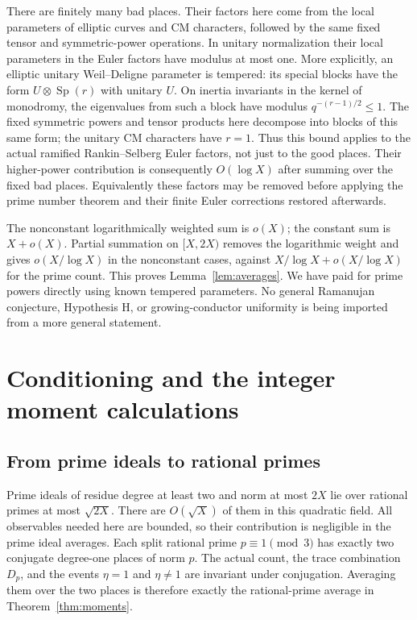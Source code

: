 \documentclass[11pt]{article}
\theoremstyle{definition}\newtheorem{definition}[theorem]{Definition}
\begin{document}
There are finitely many bad places. Their factors here
come from the local parameters of elliptic curves
and CM characters, followed by the same fixed tensor
and symmetric-power operations. In unitary
normalization their local parameters in the Euler
factors have modulus at most one. More explicitly, an elliptic
unitary Weil--Deligne parameter is tempered: its special blocks
have the form $U\otimes\operatorname{Sp}(r)$ with unitary $U$.
On inertia invariants in the kernel of monodromy, the eigenvalues
from such a block have modulus $q^{-(r-1)/2}\le1$.
The fixed symmetric powers and tensor products here decompose into
blocks of this same form; the unitary CM characters have $r=1$.
Thus this bound applies to the actual ramified Rankin--Selberg
Euler factors, not just to the good places.
Their higher-power contribution is consequently
$O(\log X)$ after summing over the fixed bad places.
Equivalently these factors may be removed before
applying the prime number theorem and their finite
Euler corrections restored afterwards.

The nonconstant logarithmically weighted sum is $o(X)$;
the constant sum is $X+o(X)$.
Partial summation on $[X,2X)$ removes the logarithmic
weight and gives $o(X/\log X)$ in the nonconstant cases,
against $X/\log X+o(X/\log X)$ for the prime count.
This proves Lemma~\ref{lem:averages}.
We have paid for prime powers directly using known
tempered parameters. No general Ramanujan conjecture,
Hypothesis H, or growing-conductor uniformity is being
imported from a more general statement.

\section{Conditioning and the integer moment calculations}\label{sec:moments}
\subsection{From prime ideals to rational primes}
Prime ideals of residue degree at least two and norm
at most $2X$ lie over rational primes at most $\sqrt{2X}$.
There are $O(\sqrt X)$ of them in this quadratic field.
All observables needed here are bounded, so their
contribution is negligible in the prime ideal averages.
Each split rational prime $p\equiv1\pmod3$ has exactly
two conjugate degree-one places of norm $p$.
The actual count, the trace combination $D_p$, and the
events $\eta=1$ and $\eta\ne1$ are invariant under
conjugation. Averaging them over the two places is
therefore exactly the rational-prime average in
Theorem~\ref{thm:moments}.
\end{document}
